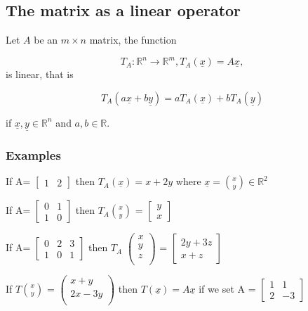 \documentclass[12pt,a4paper]{article}
\theoremstyle{regla}
\theoremstyle{remark}
\theoremstyle{definition}
\theoremstyle{nonumberbreak}
\begin{document}
\subsection{The matrix as a linear operator}
\begin{fbox}
\begin{minipage}{0.97\textwidth}
Let $A$ be an $m\times  n$ matrix, the function
 
 $$T_A:\mathbb{R}^n\to\mathbb{R}^m, T_A(\underline{x}) = A\underline{x}, $$
is linear, that is
 
$$ T_A (a\underline{x} + b\underline{y}) = aT_A(\underline{x}) + bT_A(\underline{y}) $$
 
 if $ \underline{x}, \underline{y} \in \mathbb{R}^n$ and $a, b \in \mathbb{R}$.
\end{minipage}
\end{fbox}
\subsubsection{Examples}
\begin{xmpl}

 If A=
$\begin{bmatrix}
1 & 2 
\end{bmatrix}$ then $T_A(\underline{x}) = x + 2y$ where $ \underline{x} = {x \choose y}\in \mathbb{R}^2$
\end{xmpl}


\begin{xmpl}
If A=
$\begin{bmatrix}
0 & 1  \\
1 & 0 
\end{bmatrix}$ then $ T_A{x \choose y}$ =  
$\begin{bmatrix}
y  \\
x 
\end{bmatrix}$
\end{xmpl}
\begin{xmpl}

 If A=
$\begin{bmatrix}
0 & 2 & 3\\
1 & 0 & 1
\end{bmatrix}$ then $T_A$
$\left(
\begin{array}{ccc}
  x \\
  y\\
  z\\
 \end{array} \right)$ = 
$\begin{bmatrix}
2y + 3z\\
x + z
\end{bmatrix}$
\end{xmpl}
\begin{xmpl}

If $T{x \choose y }$ = 
$\left(
 \begin{array}{cc}
   x+y  \\
  2x-3y\\
 \end{array} \right)$ then $T (\underline{x}) = A \underline{x}$ if  we set A = 
$\begin{bmatrix}
1 & 1 \\
2 & -3
\end{bmatrix}$
 \end{xmpl}
\end{document}
